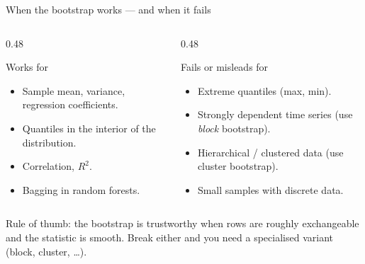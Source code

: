 \documentclass[aspectratio=169,11pt]{beamer}
\begin{document}
\begin{frame}{When the bootstrap works --- and when it fails}\label{frm:bootfails}
  \begin{columns}[T]
    \begin{column}{0.48\textwidth}
      \begin{block}{Works for}
        \begin{itemize}
          \item Sample mean, variance, regression coefficients.
          \item Quantiles in the interior of the distribution.
          \item Correlation, $R^2$.
          \item Bagging in random forests.
        \end{itemize}
      \end{block}
    \end{column}
    \begin{column}{0.48\textwidth}
      \begin{alertblock}{Fails or misleads for}
        \begin{itemize}
          \item Extreme quantiles (max, min).
          \item Strongly dependent time series (use \emph{block}
                bootstrap).
          \item Hierarchical / clustered data (use cluster bootstrap).
          \item Small samples with discrete data.
        \end{itemize}
      \end{alertblock}
    \end{column}
  \end{columns}
  \begin{takeaway}
    Rule of thumb: the bootstrap is trustworthy when rows are roughly
    exchangeable and the statistic is smooth. Break either and you need
    a specialised variant (block, cluster, \dots).
  \end{takeaway}
\end{frame}
\end{document}
